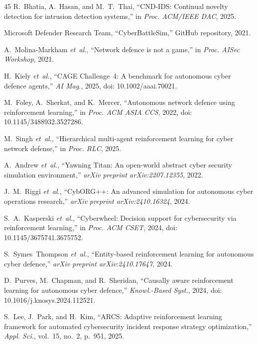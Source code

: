 \documentclass[journal]{IEEEtran}
\theoremstyle{definition}
\theoremstyle{remark}
\begin{document}
\begin{thebibliography}{45}
R.~Bhatia, A.~Hasan, and M.~T.~Thai,
``{CND-IDS}: Continual novelty detection for intrusion detection systems,''
in \emph{Proc. ACM/IEEE DAC}, 2025.

{Microsoft Defender Research Team},
``{CyberBattleSim},''
GitHub repository, 2021.

A.~Molina-Markham \textit{et~al.},
``Network defence is not a game,''
in \emph{Proc. AISec Workshop}, 2021.

H.~Kiely \textit{et~al.},
``{CAGE} {C}hallenge~4: A benchmark for autonomous cyber defence agents,''
\emph{AI Mag.}, 2025, doi: 10.1002/aaai.70021.

M.~Foley, A.~Sherkat, and K.~Mercer,
``Autonomous network defence using reinforcement learning,''
in \emph{Proc. ACM ASIA CCS}, 2022, doi: 10.1145/3488932.3527286.

M.~Singh \textit{et~al.},
``Hierarchical multi-agent reinforcement learning for cyber network defense,''
in \emph{Proc. RLC}, 2025.

A.~Andrew \textit{et~al.},
``{Yawning Titan}: An open-world abstract cyber security simulation environment,''
\emph{arXiv preprint arXiv:2207.12355}, 2022.

J.~M.~Riggi \textit{et~al.},
``{CybORG++}: An advanced simulation for autonomous cyber operations research,''
\emph{arXiv preprint arXiv:2410.16324}, 2024.

S.~A.~Kasperski \textit{et~al.},
``{Cyberwheel}: Decision support for cybersecurity via reinforcement learning,''
in \emph{Proc. ACM CSET}, 2024, doi: 10.1145/3675741.3675752.

S.~Symes~Thompson \textit{et~al.},
``Entity-based reinforcement learning for autonomous cyber defence,''
\emph{arXiv preprint arXiv:2410.17647}, 2024.

D.~Purves, M.~Chapman, and R.~Sheridan,
``Causally aware reinforcement learning for autonomous cyber defence,''
\emph{Knowl.-Based Syst.}, 2024, doi: 10.1016/j.knosys.2024.112521.

S.~Lee, J.~Park, and H.~Kim,
``{ARCS}: Adaptive reinforcement learning framework for automated cybersecurity incident response strategy optimization,''
\emph{Appl. Sci.}, vol.~15, no.~2, p.~951, 2025.


\end{thebibliography}
\end{document}
